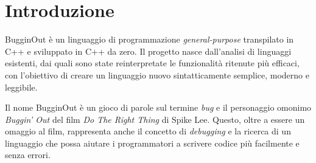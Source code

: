 
\chapter*{Introduzione}
\label{chap:introduzione}

BugginOut \`e un linguaggio di programmazione \textit{general-purpose} transpilato in C++ e sviluppato in C++ da zero. Il progetto nasce dall'analisi di linguaggi esistenti, dai quali sono state reinterpretate le funzionalit\`a ritenute pi\`u efficaci, con l'obiettivo di creare un linguaggio nuovo sintatticamente semplice, moderno e leggibile.

Il nome BugginOut \`e un gioco di parole sul termine \textit{bug} e il personaggio omonimo \textit{Buggin' Out} del film \textit{Do The Right Thing} di Spike Lee. Questo, oltre a essere un omaggio al film, rappresenta anche il concetto di \textit{debugging} e la ricerca di un linguaggio che possa aiutare i programmatori a scrivere codice pi\`u facilmente e senza errori.

